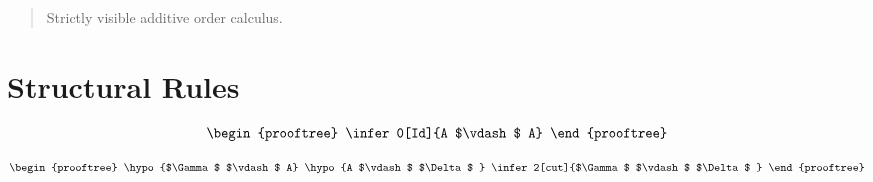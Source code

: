 


\begin{abstract}
Strictly visible additive order calculus.
\end{abstract}

\section{Structural Rules}

\begin{center}
	\[
	\begin{prooftree}
	\infer0[Id]{A $\vdash$  A}
	\end{prooftree}
	\]
	
	\[
	\begin{prooftree}
	\hypo{$\Gamma$  $\vdash$  A}
	\hypo{A $\vdash$  $\Delta$ }
	\infer2[cut]{$\Gamma$  $\vdash$  $\Delta$ }
	\end{prooftree}
	\]
\end{center}

